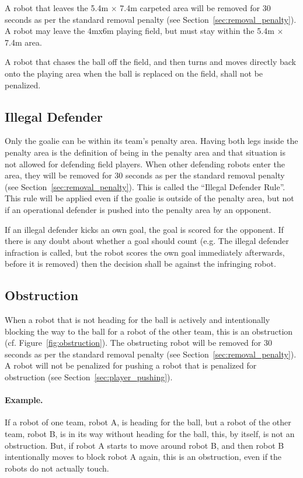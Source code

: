 \documentclass[12pt]{article}
\newcommand{\cf}{\mbox{cf.}\xspace}
\newcommand{\TotalWidth}{{5.4m }}
\newcommand{\TotalLength}{{7.4m }}
\begin{document}
A robot that leaves the \TotalWidth $\times$ \TotalLength carpeted area will be removed for 30
seconds as per the standard removal penalty (see
Section~\ref{sec:removal_penalty}).  A robot may leave the
4mx6m playing field, but must stay within the \TotalWidth $\times$ \TotalLength area.

A robot that chases the ball off the field, and then turns and moves
directly back onto the playing area when the ball is replaced on the
field, shall not be penalized.

\subsection{Illegal Defender}

Only the goalie can be within its team's penalty area. Having both
legs inside the penalty area is the definition of being in the
penalty area and that situation is not allowed for defending field
players.  When other defending robots enter the area, they will be
removed for 30 seconds as per the standard removal penalty (see
Section~\ref{sec:removal_penalty}).  This is called the ``Illegal
Defender Rule''.  This rule will be applied even if the goalie is
outside of the penalty area, but not if an operational defender is
pushed into the penalty area by an opponent.

If an illegal defender kicks an own goal, the goal is scored for the
opponent.  If there is any doubt about whether a goal should count
(e.g. The illegal defender infraction is called, but the robot scores
the own goal immediately afterwards, before it is removed) then the
decision shall be against the infringing robot.

\subsection{Obstruction}

 When a robot that is not heading for the ball is actively and
 intentionally blocking the way to the ball for a robot of the other
 team, this is an obstruction (\cf Figure~\ref{fig:obstruction}). The
 obstructing robot will be removed for 30 seconds as per the standard
 removal penalty (see Section~\ref{sec:removal_penalty}). A robot will not be penalized for pushing a robot that is penalized for obstruction (see Section~\ref{sec:player_pushing}).

 \paragraph{Example.} If a robot of one team, robot A, is heading for
 the ball, but a robot of the other team, robot B, is in its way without
 heading for the ball, this, by itself, is not an obstruction.  But,
 if robot A starts to move around robot B, and then robot B intentionally
 moves to block robot A again, this is an obstruction, even if the
 robots do not actually touch.
\end{document}
